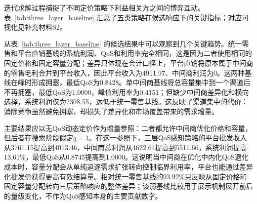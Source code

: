 \documentclass[UTF8,11pt]{ctexart}
\begin{document}
迭代求解过程捕捉了不同定价策略下利益相关方之间的博弈互动。表~\ref{tab:three_layer_baseline} 汇总了五类策略在候选响应下的关键指标；对应可视化见补充材料S2。

\begin{table}[H]
\centering
\caption{三方市场基准结果。利润为合成模型指标，QoS为有效完成服务比例；相对统一零售表示固定价格/固定容量弱基线参照，相对无QoS动态表示主要QoS增量参照。}
\label{tab:three_layer_baseline}
\small
{}
\end{table}

从表~\ref{tab:three_layer_baseline} 的候选结果中可以观察到几个关键趋势。统一零售和平台直销基线的系统利润、QoS和利用率完全相同，这是因为二者使用相同的固定价格和固定容量分配；差异只体现在会计口径上，平台直销将原本属于中间商的零售毛利合并到平台收入，因此平台收入为4911.97、中间商利润为0。这两种基线在峰时形成拥塞，最低QoS为0.8428。单中间商基线将总容量集中到一个渠道后不再拥塞，最低QoS为1.0000，峰值利用率为0.4151；但缺少中间商差异化和横向选择，系统利润仅为2308.55，远低于统一零售基线。这反映了渠道集中的代价：消除竞争虽然避免拥塞，却损失了差异化和市场覆盖带来的需求增量。

主要结果应以无QoS动态定价作为增量参照：二者都允许中间商优化价格和容量，但后者在搜索阶段假定$q=1$。在这一参照下，三层QoS感知策略的平台批发收入从3761.15提高到4013.46，中间商总利润从4622.64提高到5511.66，系统利润提高13.61\%，最低QoS从0.8745提高到1.0000。这说明当中间商在优化中内化QoS退化成本时，容量分配会从单纯追逐需求扩张转向控制临界利用率，平台也能通过差异化批发价获得更高有效结算量。相对统一零售基线的93.92\%只反映从固定价格和固定容量分配转向三层策略响应的整体差异；该弱基线比较用于展示机制展开前后的量级变化，不作为QoS感知本身的主要贡献数字。
\end{document}
